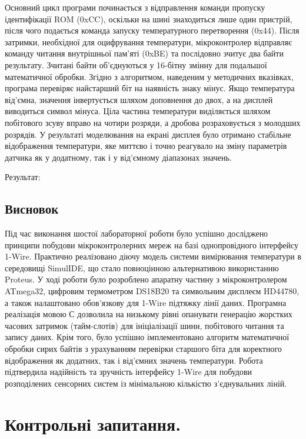 \documentclass[14pt, a4paper]{extreport}
\begin{document}
	Основний цикл програми починається з відправлення команди пропуску ідентифікації ROM (0xCC), оскільки на шині знаходиться лише один пристрій, після чого подається команда запуску температурного перетворення (0x44). Після затримки, необхідної для оцифрування температури, мікроконтролер відправляє команду читання внутрішньої пам'яті (0xBE) та послідовно зчитує два байти результату. Зчитані байти об'єднуються у 16-бітну змінну для подальшої математичної обробки. Згідно з алгоритмом, наведеним у методичних вказівках, програма перевіряє найстарший біт на наявність знаку мінус. Якщо температура від'ємна, значення інвертується шляхом доповнення до двох, а на дисплей виводиться символ мінуса. Ціла частина температури виділяється шляхом побітового зсуву вправо на чотири розряди, а дробова розраховується з молодших розрядів. У результаті моделювання на екрані дисплея було отримано стабільне відображення температури, яке миттєво і точно реагувало на зміну параметрів датчика як у додатному, так і у від'ємному діапазонах значень.
	
	Результат:
	
	
	\subsection*{Висновок}
	
	Під час виконання шостої лабораторної роботи було успішно досліджено принципи побудови мікроконтролерних мереж на базі однопровідного інтерфейсу 1-Wire. Практично реалізовано діючу модель системи вимірювання температури в середовищі SimulIDE, що стало повноцінною альтернативою використанню Proteus. У ході роботи було розроблено апаратну частину з мікроконтролером ATmega32, цифровим термометром DS18B20 та символьним дисплеєм HD44780, а також налаштовано обов'язкову для 1-Wire підтяжку лінії даних. Програмна реалізація мовою С дозволила на низькому рівні опанувати генерацію жорстких часових затримок (тайм-слотів) для ініціалізації шини, побітового читання та запису даних. Крім того, було успішно імплементовано алгоритм математичної обробки сирих байтів з урахуванням перевірки старшого біта для коректного відображення як додатних, так і від'ємних значень температури. Робота підтвердила надійність та зручність інтерфейсу 1-Wire для побудови розподілених сенсорних систем із мінімальною кількістю з'єднувальних ліній.
	
	\section*{Контрольні запитання.}
	
\end{document}
